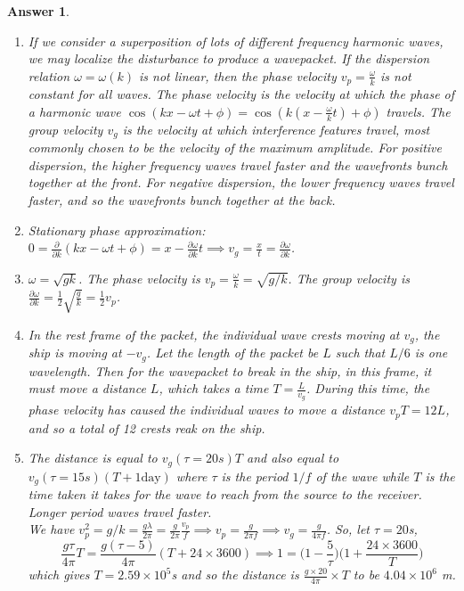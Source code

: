 \documentclass[a4paper]{article}
\newtheorem{ans}{Answer}[subsection]
\theoremstyle{new}
\begin{document}
\begin{ans}\leavevmode
\begin{enumerate}[label=(\roman*)]
\item If we consider a superposition of lots of different frequency harmonic waves, we may localize the disturbance to produce a wavepacket. If the dispersion relation $\omega=\omega(k)$ is not linear, then the phase velocity $v_p=\frac{\omega}{k}$ is not constant for all waves. The phase velocity is the velocity at which the phase of a harmonic wave $\cos(kx-\omega t+\phi)=\cos(k(x-\frac{\omega}{k}t)+\phi)$ travels. The group velocity $v_g$ is the velocity at which interference features travel, most commonly chosen to be the velocity of the maximum amplitude. For positive dispersion, the higher frequency waves travel faster and the wavefronts bunch together at the front. For negative dispersion, the lower frequency waves travel faster, and so the wavefronts bunch together at the back.
\item Stationary phase approximation: $0=\frac{\partial}{\partial k}(kx-\omega t+\phi)=x-\frac{\partial\omega}{\partial k}t\implies v_g=\frac{x}{t}=\frac{\partial\omega}{\partial k}$.
\item $\omega=\sqrt{gk}$. The phase velocity is $v_p=\frac{\omega}{k}=\sqrt{g/k}$. The group velocity is $\frac{\partial\omega}{\partial k}=\frac{1}{2}\sqrt{\frac{g}{k}}=\frac{1}{2}v_p$.
\item In the rest frame of the packet, the individual wave crests moving at $v_g$, the ship is moving at $-v_g$. Let the length of the packet be $L$ such that $L/6$ is one wavelength. Then for the wavepacket to break in the ship, in this frame, it must move a distance $L$, which takes a time $T=\frac{L}{v_g}$. During this time, the phase velocity has caused the individual waves to move a distance $v_pT=12L$, and so a total of 12 crests reak on the ship.
\item The distance is equal to $v_g(\tau=20s)T$ and also equal to $v_g(\tau=15s)(T+1\text{day})$ where $\tau$ is the period $1/f$ of the wave while $T$ is the time taken it takes for the wave to reach from the source to the receiver. Longer period waves travel faster.\\[5pt]
We have $v_p^2=g/k=\frac{g\lambda}{2\pi}=\frac{g}{2\pi}\frac{v_p}{f}\implies v_p=\frac{g}{2\pi f}\implies v_g=\frac{g}{4\pi f}$. So, let $\tau=20$s,
$$\frac{g\tau}{4\pi}T=\frac{g(\tau-5)}{4\pi}(T+24\times 3600)\implies 1=\bigg(1-\frac{5}{\tau}\bigg)\bigg(1+\frac{24\times 3600}{T}\bigg)$$
which gives $T=2.59\times10^5$s and so the distance is $\frac{g\times 20}{4\pi}\times T$ to be $4.04\times10^6$ m. 
\end{enumerate}
\end{ans}
\end{document}
